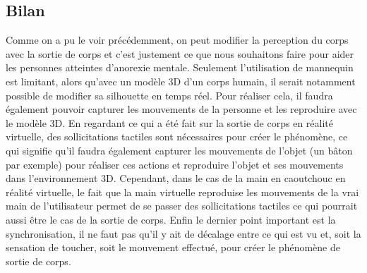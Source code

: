 \subsection{Bilan}
Comme on a pu le voir précédemment, on peut modifier la perception du corps avec la sortie de corps et c'est justement ce que nous souhaitons faire pour aider les personnes atteintes d'anorexie mentale. Seulement l'utilisation de mannequin est limitant, alors qu'avec un modèle 3D d'un corps humain, il serait notamment possible de modifier sa silhouette en temps réel. Pour réaliser cela, il faudra également pouvoir capturer les mouvements de la personne et les reproduire avec le modèle 3D. En regardant ce qui a été fait sur la sortie de corps en réalité virtuelle, des sollicitations tactiles sont nécessaires pour créer le phénomène, ce qui signifie qu'il faudra également capturer les mouvements de l'objet (un bâton par exemple) pour réaliser ces actions et reproduire l'objet et ses mouvements dans l'environnement 3D. Cependant, dans le cas de la main en caoutchouc en réalité virtuelle, le fait que la main virtuelle reproduise les mouvements de la vrai main de l'utilisateur permet de se passer des sollicitations tactiles ce qui pourrait aussi être le cas de la sortie de corps. Enfin le dernier point important est la synchronisation, il ne faut pas qu'il y ait de décalage entre ce qui est vu et, soit la sensation de toucher, soit le mouvement effectué, pour créer le phénomène de sortie de corps.

